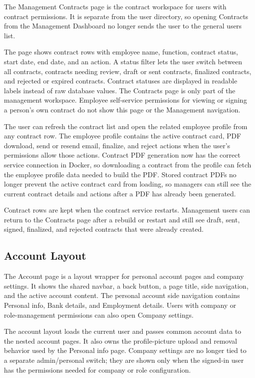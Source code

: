 \documentclass[11pt]{article}
\begin{document}
The Management Contracts page is the contract workspace for users with contract permissions. It is separate from the user directory, so opening Contracts from the Management Dashboard no longer sends the user to the general users list.

The page shows contract rows with employee name, function, contract status, start date, end date, and an action. A status filter lets the user switch between all contracts, contracts needing review, draft or sent contracts, finalized contracts, and rejected or expired contracts. Contract statuses are displayed in readable labels instead of raw database values. The Contracts page is only part of the management workspace. Employee self-service permissions for viewing or signing a person's own contract do not show this page or the Management navigation.

The user can refresh the contract list and open the related employee profile from any contract row. The employee profile contains the active contract card, PDF download, send or resend email, finalize, and reject actions when the user's permissions allow those actions. Contract PDF generation now has the correct service connection in Docker, so downloading a contract from the profile can fetch the employee profile data needed to build the PDF. Stored contract PDFs no longer prevent the active contract card from loading, so managers can still see the current contract details and actions after a PDF has already been generated.

Contract rows are kept when the contract service restarts. Management users can return to the Contracts page after a rebuild or restart and still see draft, sent, signed, finalized, and rejected contracts that were already created.
\subsection{Account Layout}

The Account page is a layout wrapper for personal account pages and company settings. It shows the shared navbar, a back button, a page title, side navigation, and the active account content. The personal account side navigation contains Personal info, Bank details, and Employment details. Users with company or role-management permissions can also open Company settings.

The account layout loads the current user and passes common account data to the nested account pages. It also owns the profile-picture upload and removal behavior used by the Personal info page. Company settings are no longer tied to a separate admin/personal switch; they are shown only when the signed-in user has the permissions needed for company or role configuration.
\end{document}
